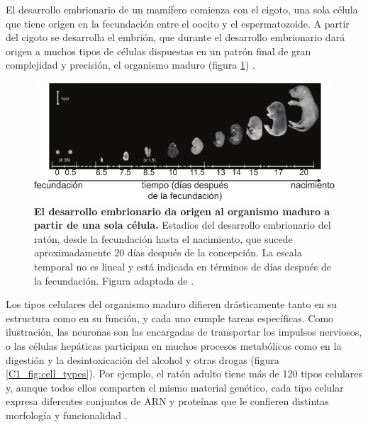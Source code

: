 \documentclass[./main.tex]{subfiles}
\begin{document}
El desarrollo embrionario de un mamífero comienza con el cigoto, una sola célula que tiene origen en la fecundación entre el oocito y el espermatozoide. A partir del cigoto se desarrolla el embrión, que durante el desarrollo embrionario dará origen a muchos tipos de células dispuestas en un patrón final de gran complejidad y precisión, el organismo maduro (figura \ref{C1_fig:mouse_emb_dev}) \cite{Alberts2008}. 


 \begin{figure}
    \centering
    \includegraphics[width=1\columnwidth]{figures/chapter1/C1_mouse_emb_dev.pdf}
    \caption{\textbf{El desarrollo embrionario da origen al organismo maduro a partir de una sola célula.} Estadíos del desarrollo embrionario del ratón, desde la fecundación hasta el nacimiento, que sucede aproximadamente 20 días después de la concepción. La escala temporal no es lineal y está indicada en términos de días después de la fecundación. Figura adaptada de \cite{Xue2013}.}
    \label{C1_fig:mouse_emb_dev}
\end{figure}


Los tipos celulares del organismo maduro difieren drásticamente tanto en su estructura como en su función, y cada uno cumple tareas específicas. Como ilustración, las neuronas son las encargadas de transportar los impulsos nerviosos, o las células hepáticas participan en muchos procesos metabólicos como en la digestión y la desintoxicación del alcohol y otras drogas  (figura \ref{C1_fig:cell_types}). Por ejemplo, el ratón adulto tiene más de 120 tipos celulares y, aunque todos ellos comparten el mismo material genético, cada tipo celular expresa diferentes conjuntos de ARN y proteínas que le confieren distintas morfología y funcionalidad \cite{Zhang2021,Weinberger2016,Schrode2013}.
\end{document}
